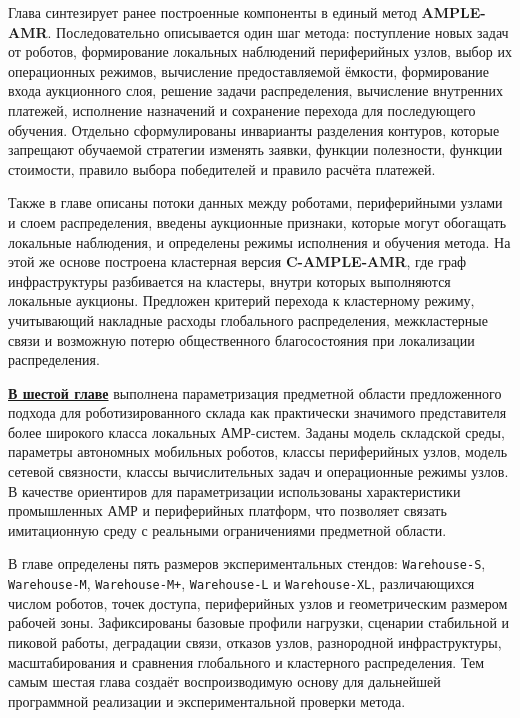 Глава синтезирует ранее построенные компоненты в единый метод
\textbf{AMPLE-AMR}. Последовательно описывается один шаг метода: поступление
новых задач от роботов, формирование локальных наблюдений периферийных узлов,
выбор их операционных режимов, вычисление предоставляемой ёмкости,
формирование входа аукционного слоя, решение задачи распределения,
вычисление внутренних платежей, исполнение назначений и сохранение перехода
для последующего обучения. Отдельно сформулированы инварианты разделения
контуров, которые запрещают обучаемой стратегии изменять заявки, функции
полезности, функции стоимости, правило выбора победителей и правило расчёта
платежей.

Также в главе описаны потоки данных между роботами, периферийными узлами и
слоем распределения, введены аукционные признаки, которые могут обогащать
локальные наблюдения, и определены режимы исполнения и обучения метода. На
этой же основе построена кластерная версия \textbf{C-AMPLE-AMR}, где граф
инфраструктуры разбивается на кластеры, внутри которых выполняются локальные
аукционы. Предложен критерий перехода к кластерному режиму, учитывающий
накладные расходы глобального распределения, межкластерные связи и возможную
потерю общественного благосостояния при локализации распределения.

\underline{\textbf{В шестой главе}} выполнена параметризация предметной области
предложенного подхода для роботизированного склада как практически значимого
представителя более широкого класса локальных АМР-систем. Заданы модель
складской среды, параметры автономных мобильных роботов, классы периферийных
узлов, модель сетевой связности, классы вычислительных задач и операционные
режимы узлов. В качестве ориентиров для параметризации использованы
характеристики промышленных АМР и периферийных платформ, что позволяет связать
имитационную среду с реальными ограничениями предметной области.

В главе определены пять размеров экспериментальных стендов:
\texttt{Warehouse-S}, \texttt{Warehouse-M}, \texttt{Warehouse-M+},
\texttt{Warehouse-L} и \texttt{Warehouse-XL}, различающихся числом роботов,
точек доступа, периферийных узлов и геометрическим размером рабочей зоны.
Зафиксированы базовые профили нагрузки, сценарии стабильной и пиковой работы,
деградации связи, отказов узлов, разнородной инфраструктуры, масштабирования и
сравнения глобального и кластерного распределения. Тем самым шестая глава
создаёт воспроизводимую основу для дальнейшей программной реализации и
экспериментальной проверки метода.

